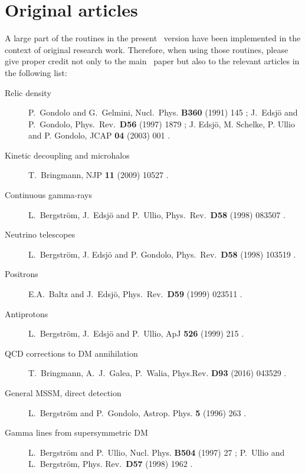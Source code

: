 \chapter{Original articles}
\label{sec:DS_papers}

A large part of the routines in the present \ds\ version have been implemented 
in the context of original research work. Therefore, when using those routines, 
please give proper credit not only to the main \ds\ paper \cite{ds4,ds6} but also
to the relevant articles in the following list:

\bigskip

  \begin{description}
    \item[Relic density] P.~Gondolo and G.~Gelmini, Nucl.\ Phys. 
         {\bfseries B360} (1991) 145 \cite{Gondolo:1990dk}; J.~Edsj{\"o} and P.~Gondolo, 
         Phys.\ Rev.\ {\bfseries D56} (1997) 1879 \cite{Edsjo:1997bg}; J. Edsj\"o, 
         M. Schelke, P. Ullio and P. Gondolo, JCAP {\bfseries 04} (2003) 001 \cite{Edsjo:2003us}.
    \item[Kinetic decoupling and microhalos]
      T.~Bringmann, NJP {\bfseries 11} (2009) 10527 \cite{Bringmann:2009vf}.
    \item[Continuous gamma-rays]
      L.~Bergstr{\"o}m, J.~Edsj{\"o} and P.~Ullio, Phys.\ Rev.\ {\bfseries D58} (1998) 083507 \cite{Bergstrom:1998zs}.
    \item[Neutrino telescopes]
       L.~Bergstr{\"o}m, J. Edsj{\"o} and P. Gondolo, Phys.\ Rev.\
      {\bfseries D58} (1998) 103519 \cite{Bergstrom:1998xh}.
    \item[Positrons]
      E.A.~Baltz and J.~Edsj{\"o}, Phys.\ Rev.\ {\bfseries D59} (1999) 023511 \cite{Baltz:1998xv}.
    \item[Antiprotons]
      L.~Bergstr{\"o}m, J.~Edsj{\"o} and P.~Ullio, ApJ {\bfseries 526} (1999) 215 \cite{Bergstrom:1999jc}.
    \item[QCD corrections to DM annihilation]
      T.~Bringmann, A.~J.~Galea, P.~Walia,  Phys.Rev. {\bfseries D93} (2016) 043529 \cite{Bringmann:2015cpa}.
    \item[General MSSM, direct detection] L.~Bergstr{\"o}m and
      P.~Gondolo, Astrop. Phys. {\bfseries 5} (1996) 263 \cite{Bergstrom:1995cz}.
    \item[Gamma lines from supersymmetric DM]
      L.~Bergstr{\"o}m and P.~Ullio, Nucl. Phys. {\bfseries B504} (1997) 27 \cite{Bergstrom:1997fh};
    P.~Ullio and L.~Bergstr\"om, Phys. Rev.\ {\bfseries D57} (1998) 1962 \cite{Ullio:1997ke}.

\end{description}
